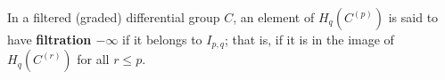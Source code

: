 In a filtered (graded) differential group $C$, an element of $H_q(C^{(p)})$ is said to have \textbf{filtration $-\infty$} if it belongs to $I_{p,q}$; that is, if it is in the image of $H_q(C^{(r)})$ for all $r \leq p$.
